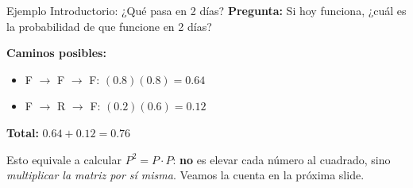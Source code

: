 \documentclass{beamer}
\begin{document}
\begin{frame}{Ejemplo Introductorio: ¿Qué pasa en 2 días?}
    \small
    \textbf{Pregunta:} Si hoy funciona, ¿cuál es la probabilidad de que funcione en 2 días?

    \vspace{0.5em}

    \textbf{Caminos posibles:}
    \begin{itemize}
        \item F $\rightarrow$ F $\rightarrow$ F: $(0.8)(0.8) = 0.64$
        \item F $\rightarrow$ R $\rightarrow$ F: $(0.2)(0.6) = 0.12$
    \end{itemize}

    \textbf{Total:} $0.64 + 0.12 = 0.76$

    \vspace{0.8em}

    Esto equivale a calcular $P^2 = P \cdot P$: \textbf{no} es elevar cada número al cuadrado, sino \emph{multiplicar la matriz por sí misma}. Veamos la cuenta en la próxima slide.
\end{frame}
\end{document}
